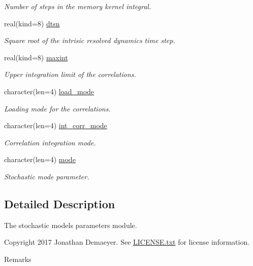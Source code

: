 \begin{DoxyCompactItemize}
\begin{DoxyCompactList}\small\item\em Number of steps in the memory kernel integral. \end{DoxyCompactList}\item 
real(kind=8) \hyperlink{namespacestoch__params_a53aa511c9ceefb077d913bf728b3f516}{dtsn}
\begin{DoxyCompactList}\small\item\em Square root of the intrisic resolved dynamics time step. \end{DoxyCompactList}\item 
real(kind=8) \hyperlink{namespacestoch__params_a50976593e79387f25e08fef6ce56b30b}{maxint}
\begin{DoxyCompactList}\small\item\em Upper integration limit of the correlations. \end{DoxyCompactList}\item 
character(len=4) \hyperlink{namespacestoch__params_ac61a48744a1bb015b5148c421837fbe7}{load\+\_\+mode}
\begin{DoxyCompactList}\small\item\em Loading mode for the correlations. \end{DoxyCompactList}\item 
character(len=4) \hyperlink{namespacestoch__params_ab901db3992a4df88db5a67fdd7be6ac6}{int\+\_\+corr\+\_\+mode}
\begin{DoxyCompactList}\small\item\em Correlation integration mode. \end{DoxyCompactList}\item 
character(len=4) \hyperlink{namespacestoch__params_a2c3f6439fd2d66413d065b533f2a6263}{mode}
\begin{DoxyCompactList}\small\item\em Stochastic mode parameter. \end{DoxyCompactList}\end{DoxyCompactItemize}


\subsection{Detailed Description}
The stochastic models parameters module. 

\begin{DoxyCopyright}{Copyright}
2017 Jonathan Demaeyer. See \hyperlink{LICENSE_8txt}{L\+I\+C\+E\+N\+S\+E.\+txt} for license information. 
\end{DoxyCopyright}
\begin{DoxyRemark}{Remarks}

\end{DoxyRemark}



